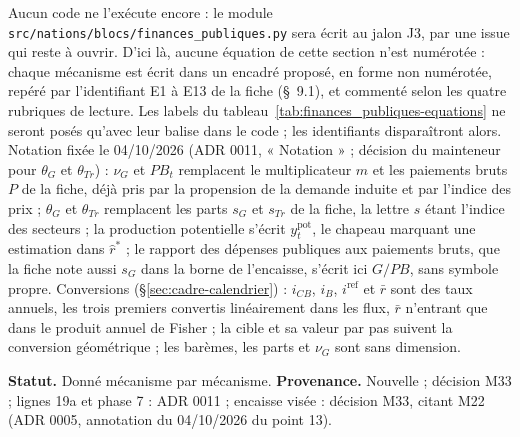 \documentclass[11pt,a4paper]{article}
\begin{document}
\begin{proposee}
Aucun code ne l'exécute encore : le module \nolinkurl{src/nations/blocs/finances_publiques.py} sera écrit au jalon J3, par une issue qui reste à ouvrir. D'ici là, aucune équation de cette section n'est numérotée : chaque mécanisme est écrit dans un encadré proposé, en forme non numérotée, repéré par l'identifiant E1 à E13 de la fiche (\S~9.1), et commenté selon les quatre rubriques de lecture. Les labels du tableau~\ref{tab:finances_publiques-equations} ne seront posés qu'avec leur balise dans le code ; les identifiants disparaîtront alors. Notation fixée le 04/10/2026 (ADR 0011, « Notation » ; décision du mainteneur pour $\theta_G$ et $\theta_{\mathit{Tr}}$) : $\nu_G$ et $\mathit{PB}_t$ remplacent le multiplicateur $m$ et les paiements bruts $P$ de la fiche, déjà pris par la propension de la demande induite et par l'indice des prix ; $\theta_G$ et $\theta_{\mathit{Tr}}$ remplacent les parts $s_G$ et $s_{\mathit{Tr}}$ de la fiche, la lettre $s$ étant l'indice des secteurs ; la production potentielle s'écrit $y^{\mathrm{pot}}_t$, le chapeau marquant une estimation dans $\hat r^\ast$ ; le rapport des dépenses publiques aux paiements bruts, que la fiche note aussi $s_G$ dans la borne de l'encaisse, s'écrit ici $G/\mathit{PB}$, sans symbole propre. Conversions (\S\ref{sec:cadre-calendrier}) : $i_{\mathit{CB}}$, $i_B$, $i^{\mathrm{ref}}$ et $\bar r$ sont des taux annuels, les trois premiers convertis linéairement dans les flux, $\bar r$ n'entrant que dans le produit annuel de Fisher ; la cible et sa valeur par pas suivent la conversion géométrique ; les barèmes, les parts et $\nu_G$ sont sans dimension.

\textbf{Statut.} Donné mécanisme par mécanisme. \textbf{Provenance.} Nouvelle ; décision M33 ; lignes 19a et phase 7 : ADR 0011 ; encaisse visée : décision M33, citant M22 (ADR 0005, annotation du 04/10/2026 du point 13).
\end{proposee}
\end{document}

